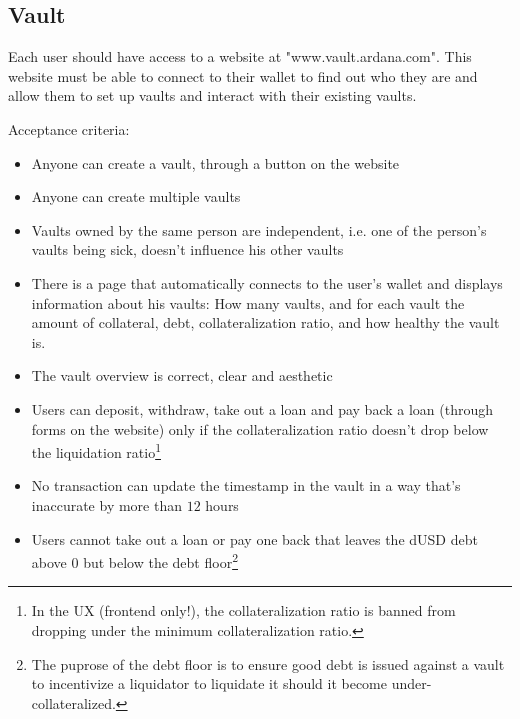 \documentclass{article} %
\begin{document}
\subsection{Vault}

Each user should have access to a website at "www.vault.ardana.com".
This website must be able to connect to their wallet to find out who they are
and allow them to set up vaults and interact with their existing vaults.

Acceptance criteria:
\begin{itemize}
  \item Anyone can create a vault, through a button on the website
  \item Anyone can create multiple vaults
  \item Vaults owned by the same person are independent, i.e. one of the
    person's vaults being sick, doesn't influence his other vaults
  \item There is a page that automatically connects to the user's wallet and
    displays information about his vaults: How many vaults, and for each vault
    the amount of collateral, debt, collateralization ratio, and how healthy the
    vault is.
  \item The vault overview is correct, clear and aesthetic
  \item Users can deposit, withdraw, take out a loan and pay back a loan
    (through forms on the website) only if the collateralization ratio doesn't
    drop below the liquidation ratio\footnote{
      In the UX (frontend only!), the collateralization ratio is banned from
      dropping under the minimum collateralization ratio.}
  \item No transaction can update the timestamp in the vault in a way that's
    inaccurate by more than $12$ hours
  \item Users cannot take out a loan or pay one back that leaves the dUSD debt
    above $0$ but below the debt floor\footnote{
    The puprose of the debt floor is to ensure good debt is issued against a
    vault to incentivize a liquidator to liquidate it should it become
    under-collateralized.}
% 


\end{itemize}
\end{document}
